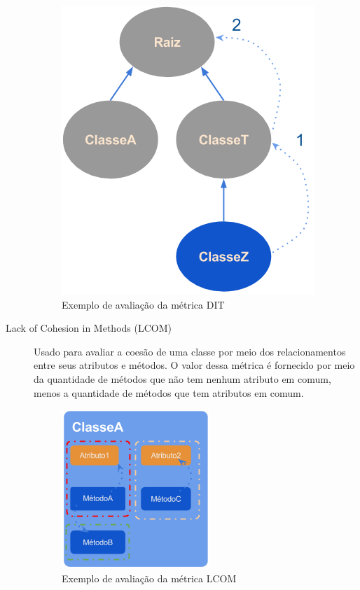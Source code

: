 \begin{description}
\begin{figure}[htb]
	\caption{\label{fig:pic_dit}Exemplo de avaliação da métrica DIT}
	\begin{center}
		\includegraphics[scale=0.6]{img/pic_dit.png}
	\end{center}
\end{figure}
\vspace{\onelineskip}
\item[Lack of Cohesion in Methods (LCOM)] Usado para avaliar a coesão de uma
classe por meio dos relacionamentos entre seus atributos e métodos.
O valor dessa métrica é fornecido por meio da quantidade de métodos que não tem
nenhum atributo em comum, menos a quantidade de métodos que tem atributos em
comum.

\begin{figure}[htb]
	\caption{\label{fig:pic_lcom_ex1}Exemplo  de avaliação da métrica LCOM}
	\begin{center}
		\includegraphics[scale=0.8]{img/pic_lcom_ex1.png}
	\end{center}
\end{figure}


\end{description}
